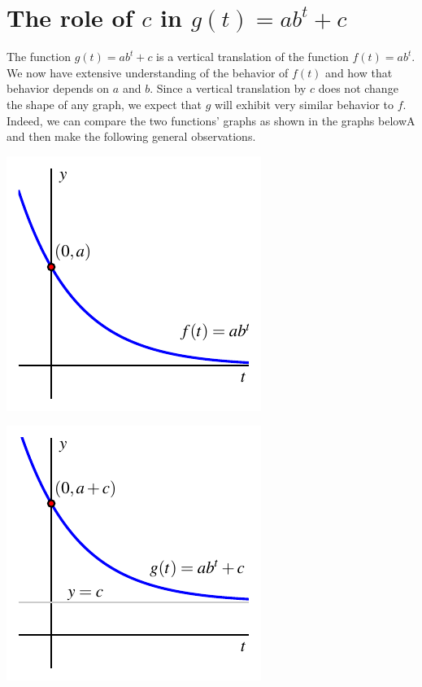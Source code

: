 \documentclass[nooutcomes]{ximera}
\begin{document}

\section{The role of $c$ in $g(t) = ab^t + c$}

The function $g(t) = ab^t + c$ is a vertical translation of the function $f(t) = ab^t$.  We now have extensive understanding of the behavior of $f(t)$ and how that behavior depends on $a$ and $b$.  Since a vertical translation by $c$ does not change the shape of any graph, we expect that $g$ will exhibit very similar behavior to $f$.  Indeed, we can compare the two functions' graphs as shown in the graphs belowA and then make the following general observations.

\begin{image}
\includegraphics{modeling-vert-transl-0.pdf}
\end{image}

\begin{image}
\includegraphics{modeling-vert-transl-c.pdf}
\end{image}
\end{document}

